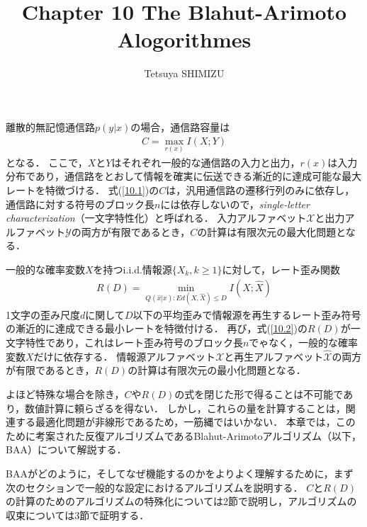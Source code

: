 \documentclass{ltjsarticle}
\theoremstyle{definition}
\begin{document}
\title{Chapter 10 The Blahut-Arimoto Alogorithmes}
\author{Tetsuya SHIMIZU}
\maketitle

離散的無記憶通信路$p(y|x)$の場合，通信路容量は
\begin{eqnarray}
  \label{10.1}
  C = \max_{r(x)} I(X;Y)
\end{eqnarray}
となる．
ここで，$X$と$Y$はそれぞれ一般的な通信路の入力と出力，$r(x)$は入力分布であり，通信路をとおして情報を確実に伝送できる漸近的に達成可能な最大レートを特徴づける．
式(\ref{10.1})の$C$は，汎用通信路の遷移行列のみに依存し，通信路に対する符号のブロック長$n$には依存しないので，\textit{single-letter characterization}（一文字特性化）と呼ばれる．
入力アルファベット$\mathcal{X}$と出力アルファベット$\mathcal{Y}$の両方が有限であるとき，$C$の計算は有限次元の最大化問題となる．

一般的な確率変数$X$を持つi.i.d.情報源$\{X_k, k \geq 1\}$に対して，レート歪み関数
\begin{eqnarray}
  \label{10.2}
  R(D) = \min_{Q(\hat{x}|x): Ed(X,\hat{X}) \leq D} I(X;\hat{X})
\end{eqnarray}
1文字の歪み尺度$d$に関して$D$以下の平均歪みで情報源を再生するレート歪み符号の漸近的に達成できる最小レートを特徴付ける．
再び，式(\ref{10.2})の$R(D)$が一文字特性であり，これはレート歪み符号のブロック長$n$でゃなく，一般的な確率変数$X$だけに依存する．
情報源アルファベット$\mathcal{X}$と再生アルファベット$\hat{\mathcal{X}}$の両方が有限であるとき，$R(D)$の計算は有限次元の最小化問題となる．

よほど特殊な場合を除き，$C$や$R(D)$の式を閉じた形で得ることは不可能であり，数値計算に頼らざるを得ない．
しかし，これらの量を計算することは，関連する最適化問題が非線形であるため，一筋縄ではいかない．
本章では，このために考案された反復アルゴリズムであるBlahut-Arimotoアルゴリズム（以下，BAA）について解説する．

BAAがどのように，そしてなぜ機能するのかをよりよく理解するために，まず次のセクションで一般的な設定におけるアルゴリズムを説明する．
$C$と$R(D)$の計算のためのアルゴリズムの特殊化については2節で説明し，アルゴリズムの収束については3節で証明する．
\end{document}
